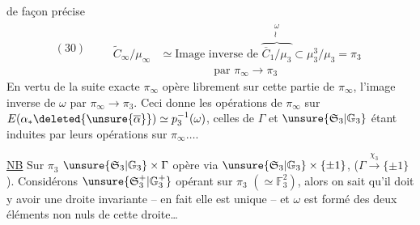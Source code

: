 de façon précise
\[
(30)\qquad\begin{aligned}
\widetilde C_\infty/\mu_\infty&\simeq\text{Image inverse de }
\overbrace{\overline C_1/\mu_3}^{\substack{\omega\\\wr}}
\subset\mu_3^3/\mu_3=\pi_3\\
&\hspace{2cm}\text{par }\pi_\infty\longrightarrow\pi_3
\end{aligned}
\]
En vertu de la suite exacte
$\pi_\infty$ opère librement sur cette partie de $\pi_\infty$, l'image inverse de
$\omega$ par $\pi_\infty\longrightarrow\pi_3$. Ceci donne les opérations de
$\pi_\infty$ sur $E(\alpha_*\deleted{\unsure{\overline\alpha}})\simeq p_3^{-1}(\omega)$,
celles de $\Gamma$ et $\unsure{\mathfrak S_3|\mathbb G_3}$ étant induites par
leurs opérations sur $\pi_\infty\ldots$.

\uline{NB} Sur $\pi_3$ 
$\unsure{\mathfrak S_3|\mathbb G_3}\times\Gamma$ opère via
$\unsure{\mathfrak S_3|\mathbb G_3}\times\{\pm1\}$,
($\Gamma\overset{\chi_3}{\longrightarrow}\{\pm1\}$).
Considérons $\unsure{\mathfrak S_3^+|\mathbb G_3^+}$ 
opérant sur $\pi_3$ $(\simeq\mathbb F_3^2)$, alors on sait qu'il doit y avoir
une droite invariante --  en fait elle est unique -- et
$\omega$ est formé des deux éléments non nuls de cette droite\ldots

